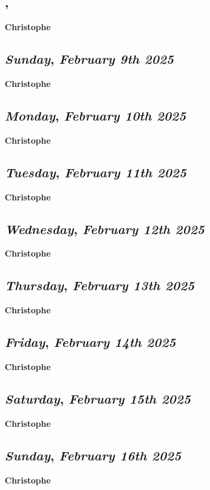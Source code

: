 \subsection*{\weekday, \day}
\textbf {Christophe}

\def\day{\textit{February 9th 2025}}
\def\weekday{\textit{Sunday}}
\subsection*{\weekday, \day}
\textbf {Christophe}

\def\day{\textit{February 10th 2025}}
\def\weekday{\textit{Monday}}
\subsection*{\weekday, \day}
\textbf {Christophe}

\def\day{\textit{February 11th 2025}}
\def\weekday{\textit{Tuesday}}
\subsection*{\weekday, \day}
\textbf {Christophe}

\def\day{\textit{February 12th 2025}}
\def\weekday{\textit{Wednesday}}
\subsection*{\weekday, \day}
\textbf {Christophe}

\def\day{\textit{February 13th 2025}}
\def\weekday{\textit{Thursday}}
\subsection*{\weekday, \day}
\textbf {Christophe}

\def\day{\textit{February 14th 2025}}
\def\weekday{\textit{Friday}}
\subsection*{\weekday, \day}
\textbf {Christophe}

\def\day{\textit{February 15th 2025}}
\def\weekday{\textit{Saturday}}
\subsection*{\weekday, \day}
\textbf {Christophe}

\def\day{\textit{February 16th 2025}}
\def\weekday{\textit{Sunday}}
\subsection*{\weekday, \day}
\textbf {Christophe}

